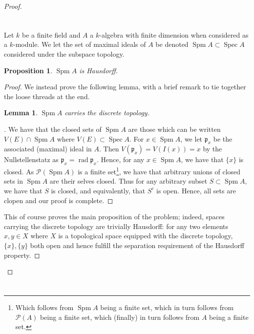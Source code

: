 \documentclass[english]{article}
\DeclareMathOperator{\spec}{Spec}
\DeclareMathOperator{\spm}{Spm}
\DeclareMathOperator{\rad}{rad}
\newcommand{\Pcal}{\mathcal{P}}
\newcommand{\pfr}{\mathfrak{p}}
\newenvironment{subproof}[1][\proofname]{%
	\renewcommand{\qedsymbol}{$\blacksquare$}%
	\begin{proof}[#1]%
	}{%
	\end{proof}%
}
\newcommand{\prob}[1]{\setcounter{section}{#1-1}\section{}}
\newtheorem*{lemma*}{Lemma}
\newtheorem*{proposition*}{Proposition}
\theoremstyle{remark}
\theoremstyle{definition}
\begin{document}
\begin{proof}
%
%
%
%
	\prob{7} 	Let $k$ be a finite field and $A$ a $k$-algebra with finite dimension when considered as a $k$-module. We let the set of maximal ideals of $A$ be denoted $\spm A\subset \spec A$ considered under the subspace topology.
	\begin{proposition*}
	$\spm A$ is Hausdorff.
		\end{proposition*}
	\begin{proof}
	We instead prove the following lemma, with a brief remark to tie together the loose threads at the end.
	\begin{lemma*}
	$\spm A$ carries the discrete topology.
	\end{lemma*}	
\begin{subproof}
We have that the closed sets of $\spm A$ are those which can be written $V(E)\cap \spm A$ where $V(E)\subset \spec A$. For $x\in \spm A$, we let $\pfr_x$ be the associated (maximal) ideal in $A$. Then $V(\pfr_x)=V(I(x))=x$ by the Nullstellenstatz as $\pfr_x=\rad \pfr_x$. Hence, for any $x\in \spm A$, we have that $\{x\}$ is closed. As $\Pcal(\spm A)$ is a finite set\footnote{Which follows from $\spm A$ being a finite set, which in turn follows from $\Pcal(A)$ being a finite set, which (finally) in turn follows from $A$ being a finite set.}, we have that arbitrary unions of closed sets in $\spm A$ are their selves closed. Thus for any arbitrary subset $S\subset \spm A$, we have that $S$ is closed, and equivalently, that $S^c$ is open. Hence, all sets are clopen and our proof is complete.
\end{subproof}
This of course proves the main proposition of the problem; indeed, spaces carrying the discrete topology are trivially Hausdorff: for any two elements $x,y\in X$ where $X$ is a topological space equipped with the discrete topology, $\{x\}, \{y\}$ both open and hence fulfill the separation requirement of the Hausdorff property.
	\end{proof}
\end{proof}
%
%
%
%
%
\prob{8}
\end{document}
